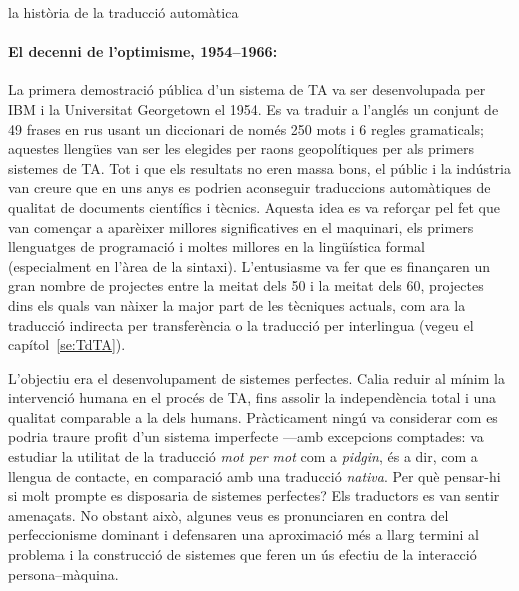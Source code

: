 \begin{persabermes}{la història de la traducció automàtica}
  \paragraph{El decenni de l'optimisme, 1954--1966:}
  La primera demostració pública d'un sistema de TA va ser
  desenvolupada per IBM i la Universitat Georgetown el 1954.  Es va
  traduir a l'anglés un conjunt de 49 frases en rus usant un
  diccionari de només 250 mots i 6 regles gramaticals; aquestes
  llengües van ser les elegides per raons geopolítiques per als
  primers sistemes de TA.  Tot i que els resultats no eren massa bons,
  el públic i la indústria van creure que en uns anys es podrien
  aconseguir traduccions automàtiques de qualitat de documents
  científics i tècnics.  Aquesta idea es va reforçar pel fet que van
  començar a aparèixer millores significatives en el maquinari, els
  primers llenguatges de programació i moltes millores en la
  lingüística formal (especialment en l'àrea de la
  sintaxi). L'entusiasme va fer que es finançaren un gran nombre de
  projectes entre la meitat dels 50 i la meitat dels 60, projectes
  dins els quals van nàixer la major part de les tècniques actuals,
  com ara la traducció indirecta per transferència o la traducció per
  interlingua (vegeu el capítol~\ref{se:TdTA}).

  L'objectiu era el desenvolupament de sistemes perfectes. Calia
  reduir al mínim la intervenció humana en el procés de TA, fins
  assolir la independència total i una qualitat comparable a la dels
  humans. Pràcticament ningú va considerar com es podria traure profit
  d'un sistema imperfecte ---amb excepcions comptades:
  \cite{masterman67b} va estudiar la utilitat de la traducció
  \emph{mot per mot} com a \emph{pidgin}, és a dir, com a llengua de
  contacte, en comparació amb una traducció \emph{nativa}. Per què
  pensar-hi si molt prompte es disposaria de sistemes perfectes? Els
  traductors es van sentir amenaçats. No obstant això, algunes veus es
  pronunciaren en contra del perfeccionisme dominant i defensaren una
  aproximació més a llarg termini al problema i la construcció de
  sistemes que feren un ús efectiu de la interacció persona--màquina.


\end{persabermes}
